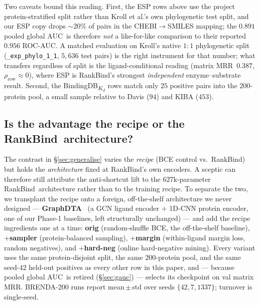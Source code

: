 \documentclass[11pt,a4paper]{article}
\newcommand{\method}{RankBind\xspace}
\newcommand{\gauc}{global AUC}
\newcommand{\matmrr}{matrix MRR}
\begin{document}
Two caveats bound this reading. First, the ESP rows above use the
project protein-stratified split rather than Kroll et al.'s own
phylogenetic test split, and our ESP copy drops $\sim\!20\%$ of pairs in
the CHEBI$\to$SMILES mapping; the $0.891$ pooled \gauc\ is therefore
\emph{not} a like-for-like comparison to their reported $0.956$ ROC-AUC.
A matched evaluation on Kroll's native $1{:}1$ phylogenetic split
(\texttt{\_exp\_phylo\_1\_1}, $5{,}636$ test pairs) is the right
instrument for that number; what transfers regardless of split is the
ligand-conditional reading (\matmrr\ $0.387$, $\rho_{\text{row}}
\approx 0$), where ESP is \method's strongest \emph{independent} enzyme--substrate result.
Second, the BindingDB\textsubscript{$K_d$} rows match only $25$
positive pairs into the $200$-protein pool, a small sample relative to
Davis ($94$) and KIBA ($453$).

\subsection{Is the advantage the recipe or the \method\ architecture?}
\label{sec:recipetransfer}

The contrast in \S\ref{sec:generalise} varies the \emph{recipe} (BCE
control vs.\ \method) but holds the \emph{architecture} fixed at
\method's own encoders. A sceptic can therefore still attribute the
anti-shortcut lift to the $627$k-parameter \method\ architecture rather
than to the training recipe. To separate the two, we transplant the
recipe onto a foreign, off-the-shelf architecture we never designed ---
\textbf{GraphDTA}~\citep{nguyen2021graphdta} (a GCN ligand encoder $+$
1D-CNN protein encoder, one of our Phase-1 baselines, left structurally
unchanged) --- and add the recipe ingredients one at a time:
\textbf{orig} (random-shuffle BCE, the off-the-shelf baseline),
\textbf{$+$sampler} (protein-balanced sampling), \textbf{$+$margin}
(within-ligand margin loss, random negatives), and \textbf{$+$hard-neg}
(online hard-negative mining). Every variant uses the same
protein-disjoint split, the same $200$-protein pool, and the same
seed-42 held-out positives as every other row in this paper, and ---
because pooled \gauc\ is retired (\S\ref{sec:gauc}) --- selects its
checkpoint on val \matmrr. BRENDA-200 runs report mean\,$\pm$\,std over
seeds $\{42,7,1337\}$; turnover is single-seed.
\end{document}
